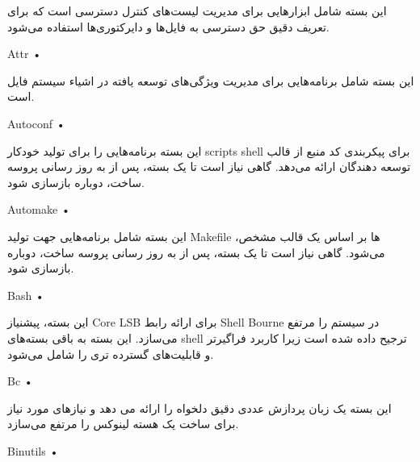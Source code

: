 \documentclass{book}
\begin{document}
این بسته شامل ابزارهایی برای مدیریت لیست‌های کنترل دسترسی است که برای تعریف دقیق حق دسترسی به فایل‌ها و دایرکتوری‌ها استفاده می‌شود.

\begin{flushleft}


	Attr  •
	
\end{flushleft}

این بسته شامل برنامه‌هایی برای مدیریت ویژگی‌های توسعه یافته در اشیاء سیستم فایل است.

\begin{flushleft}


	Autoconf  •
	
\end{flushleft}

این بسته برنامه‌هایی را برای تولید خودکار scripts shell برای پیکربندی کد منبع از قالب توسعه دهندگان ارائه می‌دهد. گاهی نیاز است تا یک بسته، پس از به روز رسانی پروسه ساخت، دوباره بازسازی شود.

\begin{flushleft}


	Automake  •
	
\end{flushleft}

این بسته شامل برنامه‌هایی جهت تولید Makefile ها بر اساس یک قالب مشخص، می‌شود. گاهی نیاز است تا یک بسته، پس از به روز رسانی پروسه ساخت، دوباره بازسازی شود.

\begin{flushleft}


	Bash  •
	
\end{flushleft}

این بسته، پیشنیاز Core LSB برای ارائه رابط Shell Bourne در سیستم را مرتفع می‌سازد. این بسته به باقی بسته‌های shell ترجیح داده شده است زیرا کاربرد فراگیرتر و قابلیت‌های گسترده تری را شامل می‌شود.

\begin{flushleft}


	Bc  •
	
\end{flushleft}

این بسته یک زبان پردازش عددی دقیق دلخواه را ارائه می دهد و نیاز‌های مورد نیاز برای ساخت یک هسته لینوکس را مرتفع می‌سازد.

\begin{flushleft}


	Binutils  •
	
\end{flushleft}
\end{document}
